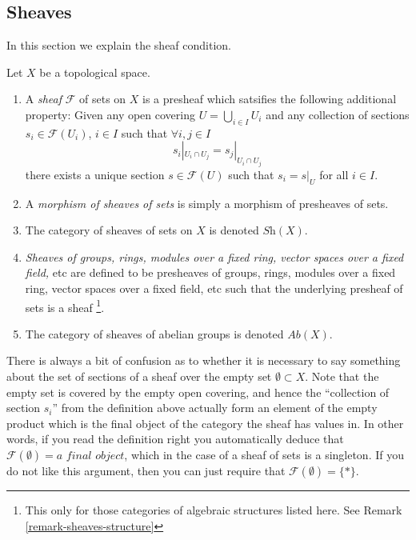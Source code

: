 \subsection{Sheaves}
\label{subsection-sheaves}

\noindent
In this section we explain the sheaf condition.

\begin{definition}
\label{definition-sheaf}
Let $X$ be a topological space.
\begin{enumerate}
\item A {\it sheaf} $\mathcal{F}$ of sets on $X$ is a presheaf
which satsifies the following additional property: Given
any open covering $U = \bigcup_{i \in I} U_i$ and any collection
of sections $s_i \in \mathcal{F}(U_i)$, $i \in I$ such that
$\forall i,j\in I$
$$
s_i|_{U_i \cap U_j} = s_j|_{U_i \cap U_j}
$$
there exists a unique section $s \in \mathcal{F}(U)$ such that
$s_i = s|_U$ for all $i \in I$.
\item A {\it morphism of sheaves of sets} is simply a
morphism of presheaves of sets.
\item The category of sheaves of sets on $X$ is denoted
$\textit{Sh}(X)$.
\item {\it Sheaves of groups, rings, modules
over a fixed ring, vector spaces over a fixed field,} etc
are defined to be presheaves of groups, rings, modules over
a fixed ring, vector spaces over a fixed field, etc such
that the underlying presheaf of sets is a sheaf%
\footnote{This only for those categories of algebraic
structures listed here. See Remark \ref{remark-sheaves-structure}}.
\item The category of sheaves of abelian groups
is denoted $\textit{Ab}(X)$.
\end{enumerate}
\end{definition}

\begin{remark}
There is always a bit of confusion as to whether it is
necessary to say something about the set of sections of
a sheaf over the empty set $\emptyset \subset X$.
Note that the empty set is
covered by the empty open covering, and hence the ``collection
of section $s_i$'' from the definition above actually form
an element of the empty product which is the final object
of the category the sheaf has values in. In other words,
if you read the definition right you automatically deduce
that $\mathcal{F}(\emptyset) = \textit{a final object}$,
which in the case of a sheaf of sets is a singleton.
If you do not like this argument, then you can just require
that $\mathcal{F}(\emptyset) = \{*\}$.
\end{remark}

